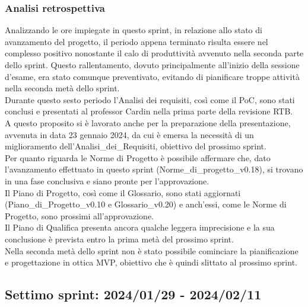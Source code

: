 \newpage
\subsubsection{Analisi retrospettiva}
Analizzando le ore impiegate in questo sprint, in relazione allo stato di avanzamento del progetto, il periodo appena terminato risulta essere nel complesso positivo nonostante il calo di produttività avvenuto nella seconda parte dello sprint. Questo rallentamento, dovuto principalmente all'inizio della sessione d'esame, era stato comunque preventivato, evitando di pianificare troppe attività nella seconda metà dello sprint.\\Durante questo sesto periodo l'Analisi dei requisiti, così come il PoC, sono stati conclusi e presentati al professor Cardin nella prima parte della revisione RTB.\\
A questo proposito si è lavorato anche per la preparazione della presentazione, avvenuta in data 23 gennaio 2024, da cui è emersa la necessità di un miglioramento dell'Analisi\_dei\_Requisiti, obiettivo del prossimo sprint.\\
Per quanto riguarda le Norme di Progetto è possibile affermare che, dato l'avanzamento effettuato in questo sprint (Norme\_di\_progetto\_v0.18), si trovano in una fase conclusiva e siano pronte per l'approvazione.\\
Il Piano di Progetto, così come il Glossario, sono stati aggiornati (Piano\_di\_Progetto\_v0.10 e Glossario\_v0.20) e anch'essi, come le Norme di Progetto, sono prossimi all'approvazione.\\
Il Piano di Qualifica presenta ancora qualche leggera imprecisione e la sua conclusione è prevista entro la prima metà del prossimo sprint.\\
Nella seconda metà dello sprint non è stato possibile cominciare la pianificazione e progettazione in ottica MVP, obiettivo che è quindi slittato al prossimo sprint.
\newpage


\subsection{Settimo sprint: 2024/01/29 - 2024/02/11}

